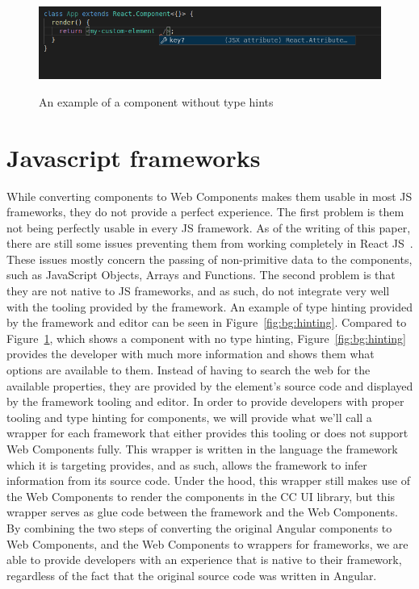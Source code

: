 \begin{figure}[h]
	\caption{An example of a component without type hints}
	\includegraphics[width=\columnwidth]{figures/background/no-hinting.png}
	\label{fig:bg:no-hinting}
	\centering
\end{figure}

\section{Javascript frameworks}\label{sec:bg:jsframeworks}
While converting components to Web Components makes them usable in most JS frameworks, they do not provide a perfect experience. The first problem is them not being perfectly usable in every JS framework. As of the writing of this paper, there are still some issues preventing them from working completely in React JS~. These issues mostly concern the passing of non-primitive data to the components, such as JavaScript Objects, Arrays and Functions. The second problem is that they are not native to JS frameworks, and as such, do not integrate very well with the tooling provided by the framework. An example of type hinting provided by the framework and editor can be seen in Figure~\ref{fig:bg:hinting}. Compared to Figure~\ref{fig:bg:no-hinting}, which shows a component with no type hinting, Figure~\ref{fig:bg:hinting} provides the developer with much more information and shows them what options are available to them. Instead of having to search the web for the available properties, they are provided by the element's source code and displayed by the framework tooling and editor. In order to provide developers with proper tooling and type hinting for components, we will provide what we'll call a wrapper for each framework that either provides this tooling or does not support Web Components fully. This wrapper is written in the language the framework which it is targeting provides, and as such, allows the framework to infer information from its source code. Under the hood, this wrapper still makes use of the Web Components to render the components in the CC UI library, but this wrapper serves as glue code between the framework and the Web Components. By combining the two steps of converting the original Angular components to Web Components, and the Web Components to wrappers for frameworks, we are able to provide developers with an experience that is native to their framework, regardless of the fact that the original source code was written in Angular.
